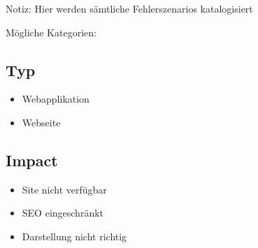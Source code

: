 
Notiz: Hier werden sämtliche Fehlerszenarios katalogisiert

Mögliche Kategorien:

\subsection{Typ}
\begin{itemize}
  \item Webapplikation
  \item Webseite
\end{itemize}

\subsection{Impact}
\begin{itemize}
  \item Site nicht verfügbar
  \item SEO eingeschränkt
  \item Darstellung nicht richtig
\end{itemize}
